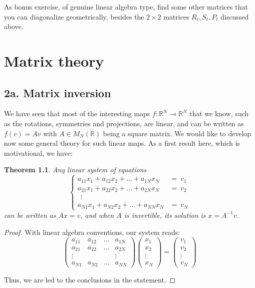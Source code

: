 \documentclass[12pt]{amsbook}
\newtheorem{theorem}{Theorem}[chapter]
\begin{document}
As bonus exercise, of genuine linear algebra type, find some other matrices that you can diagonalize geometrically, besides the $2\times 2$ matrices $R_t,S_t,P_t$ discussed above.

\chapter{Matrix theory}

\section*{2a. Matrix inversion}

We have seen that most of the interesting maps $f:\mathbb R^N\to\mathbb R^N$ that we know, such as the rotations, symmetries and projections, are linear, and can be written as $f(v)=Av$ with $A\in M_N(\mathbb R)$ being a square matrix. We would like to develop now some general theory for such linear maps. As a first result here, which is motivational, we have:


\begin{theorem}
Any linear system of equations 
$$\begin{cases}
a_{11}x_1+a_{12}x_2+\ldots+a_{1N}x_N\!\!\!&=\ v_1\\
a_{21}x_1+a_{22}x_2+\ldots+a_{2N}x_N\!\!\!&=\ v_2\\
\ \ \vdots\\
a_{N1}x_1+a_{N2}x_2+\ldots+a_{NN}x_N\!\!\!&=\ v_N
\end{cases}$$
can be written as $Ax=v$, and when $A$ is invertible, its solution is $x=A^{-1}v$.
\end{theorem}

\begin{proof}
With linear algebra conventions, our system reads:
$$\begin{pmatrix}
a_{11}&a_{12}&\ldots&a_{1N}\\
a_{21}&a_{22}&\ldots&a_{2N}\\
\vdots&&&\vdots\\
a_{N1}&a_{N2}&\ldots&a_{NN}
\end{pmatrix}
\begin{pmatrix}
x_1\\
x_2\\
\vdots\\
x_N
\end{pmatrix}
=\begin{pmatrix}
v_1\\
v_2\\
\vdots\\
v_N
\end{pmatrix}$$

Thus, we are led to the conclusions in the statement.
\end{proof}
\end{document}
